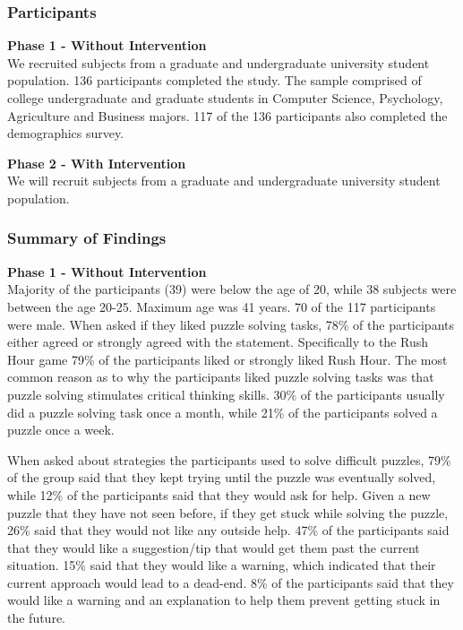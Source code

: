 \subsubsection*{Participants}
\textbf{Phase 1 - Without Intervention}\\
We recruited subjects from a graduate and undergraduate university student population. 136 participants completed the study. The sample comprised of college undergraduate and graduate students in Computer Science, Psychology, Agriculture and Business majors. 117 of the 136 participants also completed the demographics survey.

\textbf{Phase 2 - With Intervention}\\
We will recruit subjects from a graduate and undergraduate university student population.

\subsubsection*{Summary of Findings}
\textbf{Phase 1 - Without Intervention}\\
Majority of the participants (39) were below the age of 20, while 38 subjects were between the age 20-25. Maximum age was 41 years. 70 of the 117 participants were male. When asked if they liked puzzle solving tasks, 78\% of the participants either agreed or strongly agreed with the statement. Specifically to the Rush Hour game 79\% of the participants liked or strongly liked Rush Hour. The most common reason as to why the participants liked puzzle solving tasks was that puzzle solving stimulates critical thinking skills. 30\% of the participants usually did a puzzle solving task once a month, while 21\% of the participants solved a puzzle once a week.

When asked about strategies the participants used to solve difficult puzzles, 79\% of the group said that they kept trying until the puzzle was eventually solved, while 12\% of the participants said that they would ask for help.  Given a new puzzle that they have not seen before, if they get stuck while solving the puzzle, 26\% said that they would not like any outside help. 47\% of the participants said that they would like a suggestion/tip that would get them past the current situation. 15\% said that they would like a warning, which indicated that their current approach would lead to a dead-end. 8\% of the participants said that they would like a warning and an explanation to help them prevent getting stuck in the future.  

